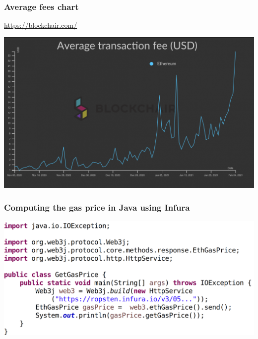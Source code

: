 \documentclass[11pt]{beamer}  %
\begin{document}
\begin{frame}\frametitle{Average fees chart}

  \begin{greenbox}{\url{https://blockchair.com/}}
    \begin{center}
      \includegraphics[width=\textwidth,clip=false]{pictures/ethereum-fees-chart.png}
    \end{center}
  \end{greenbox}

\end{frame}

\begin{frame}\frametitle{Computing the gas price in Java using Infura}

  \begin{center}
    \includegraphics[width=\textwidth,clip=false]{pictures/get-gas-price-java.png}
  \end{center}

\end{frame}
\end{document}
